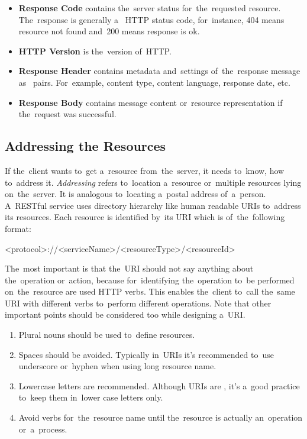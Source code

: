 \begin{itemize}
  \item \textbf{Response Code} contains the~server status for~the~requested
  resource. The~response is generally a~ HTTP status code,
  for~instance, 404 means resource not found and~200 means response is ok.
  \item \textbf{HTTP Version} is the~version of~HTTP.
  \item \textbf{Response Header} contains metadata and~settings of~the~response
  message as~ pairs. For~example, content type, content language,
  response date, etc.
  \item \textbf{Response Body} contains message content or~resource
  representation if the~request was successful.
\end{itemize}


\subsection{Addressing the Resources}
If the~client wants to~get a~resource from~the~server, it needs to~know, how
to~address it. \textit{Addressing} refers to~location a~resource or~multiple
resources lying on~the~server. It is analogous to~locating a~postal address
of~a~person. A~RESTful service uses directory hierarchy like human readable URIs
to~address its resources. Each resource is identified by~its URI which is
of~the~following format:

\begin{equotation}
<protocol>://<serviceName>/<resourceType>/<resourceId>
\end{equotation}

The~most important is that the~URI should not say anything about the~operation
or~action, because for~identifying the~operation to~be performed on~the~resource
are used HTTP verbs. This enables the~client to~call the~same URI with different
verbs to~perform different operations. Note that other important points should
be considered too while designing a~URI.

\begin{enumerate}
  \item Plural nouns should be used to~define resources.
  \item Spaces should be avoided. Typically in~URIs it's recommended to~use
  underscore or~hyphen when using long resource name.
  \item Lowercase letters are recommended. Although URIs are
  , it's a~good practice to~keep them in~lower case letters
  only.
  \item Avoid verbs for~the~resource name until the~resource is actually
  an~operation or~a~process.
\end{enumerate}

